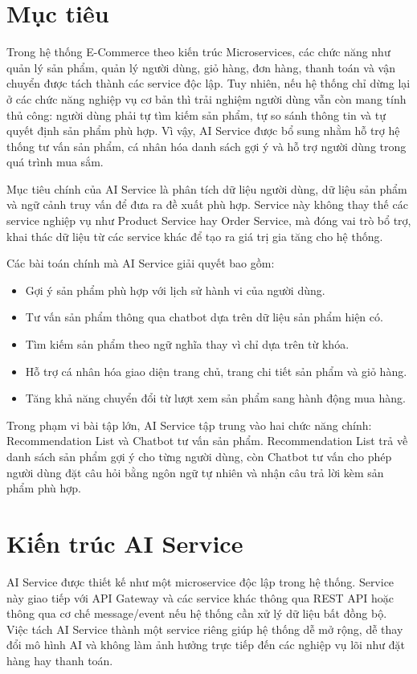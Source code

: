 \documentclass[../main.tex]{subfiles}
\begin{document}
\section{Mục tiêu}

Trong hệ thống E-Commerce theo kiến trúc Microservices, các chức năng như quản lý sản phẩm, quản lý người dùng, giỏ hàng, đơn hàng, thanh toán và vận chuyển được tách thành các service độc lập. Tuy nhiên, nếu hệ thống chỉ dừng lại ở các chức năng nghiệp vụ cơ bản thì trải nghiệm người dùng vẫn còn mang tính thủ công: người dùng phải tự tìm kiếm sản phẩm, tự so sánh thông tin và tự quyết định sản phẩm phù hợp. Vì vậy, AI Service được bổ sung nhằm hỗ trợ hệ thống tư vấn sản phẩm, cá nhân hóa danh sách gợi ý và hỗ trợ người dùng trong quá trình mua sắm.

Mục tiêu chính của AI Service là phân tích dữ liệu người dùng, dữ liệu sản phẩm và ngữ cảnh truy vấn để đưa ra đề xuất phù hợp. Service này không thay thế các service nghiệp vụ như Product Service hay Order Service, mà đóng vai trò bổ trợ, khai thác dữ liệu từ các service khác để tạo ra giá trị gia tăng cho hệ thống.

Các bài toán chính mà AI Service giải quyết bao gồm:

\begin{itemize}
    \item Gợi ý sản phẩm phù hợp với lịch sử hành vi của người dùng.
    \item Tư vấn sản phẩm thông qua chatbot dựa trên dữ liệu sản phẩm hiện có.
    \item Tìm kiếm sản phẩm theo ngữ nghĩa thay vì chỉ dựa trên từ khóa.
    \item Hỗ trợ cá nhân hóa giao diện trang chủ, trang chi tiết sản phẩm và giỏ hàng.
    \item Tăng khả năng chuyển đổi từ lượt xem sản phẩm sang hành động mua hàng.
\end{itemize}

Trong phạm vi bài tập lớn, AI Service tập trung vào hai chức năng chính: Recommendation List và Chatbot tư vấn sản phẩm. Recommendation List trả về danh sách sản phẩm gợi ý cho từng người dùng, còn Chatbot tư vấn cho phép người dùng đặt câu hỏi bằng ngôn ngữ tự nhiên và nhận câu trả lời kèm sản phẩm phù hợp.

\section{Kiến trúc AI Service}

AI Service được thiết kế như một microservice độc lập trong hệ thống. Service này giao tiếp với API Gateway và các service khác thông qua REST API hoặc thông qua cơ chế message/event nếu hệ thống cần xử lý dữ liệu bất đồng bộ. Việc tách AI Service thành một service riêng giúp hệ thống dễ mở rộng, dễ thay đổi mô hình AI và không làm ảnh hưởng trực tiếp đến các nghiệp vụ lõi như đặt hàng hay thanh toán.
\end{document}
